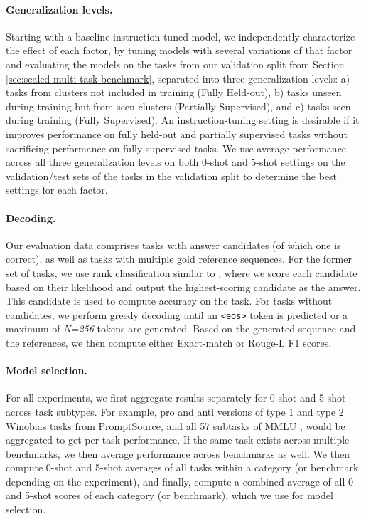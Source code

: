\paragraph{Generalization levels.} Starting with a baseline instruction-tuned model, we independently characterize the effect of each factor, by tuning models with several variations of that factor and evaluating the models on the tasks from our validation split from Section \ref{sec:scaled-multi-task-benchmark}, separated into three generalization levels: a) tasks from clusters not included in training (Fully Held-out), b) tasks unseen during training but from seen clusters (Partially Supervised), and c) tasks seen during training (Fully Supervised). An instruction-tuning setting is desirable if it improves performance on fully held-out and partially supervised tasks without sacrificing performance on fully supervised tasks. We use average performance across all three generalization levels on both 0-shot and 5-shot settings on the validation/test sets of the tasks in the validation split to determine the best settings for each factor. 

\paragraph{Decoding.} 
\label{sec:decoding}
Our evaluation data comprises tasks with answer candidates (of which one is correct), as well as tasks with multiple gold reference sequences. For the former set of tasks, we use rank classification similar to \cite{gpt3}, where we score each candidate based on their likelihood and output the highest-scoring candidate as the answer. This candidate is used to compute accuracy on the task. For tasks without candidates, we perform greedy decoding until an \texttt{<eos>} token is predicted or a maximum of \textit{N=256} tokens are generated. Based on the generated sequence and the references, we then compute either Exact-match or Rouge-L F1 scores.

\paragraph{Model selection.} For all experiments, we first aggregate results separately for 0-shot and 5-shot across task subtypes. For example, pro and anti versions of type 1 and type 2 Winobias \citep{zhao2018gender} tasks from PromptSource, and all 57 subtasks of MMLU \citep{hendrycks2020measuring}, would be aggregated to get per task performance. If the same task exists across multiple benchmarks, we then average performance across benchmarks as well. We then compute 0-shot and 5-shot averages of all tasks within a category (or benchmark depending on the experiment), and finally, compute a combined average of all 0 and 5-shot scores of each category (or benchmark), which we use for model selection. 

